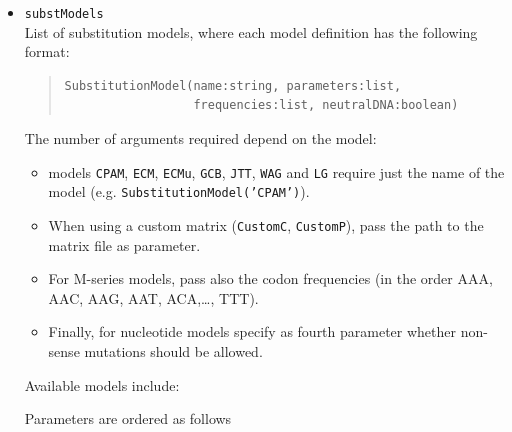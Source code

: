 \documentclass[11pt]{article}
\begin{document}
\begin{itemize}
\item{\texttt{substModels}} \hfill \\
List of substitution models, where each model definition has the following format:
\begin{quote}
\begin{verbatim}
SubstitutionModel(name:string, parameters:list, 
                  frequencies:list, neutralDNA:boolean)
\end{verbatim}
\end{quote}
The number of arguments required depend on the model:
\begin{itemize}
\item models \texttt{CPAM}, \texttt{ECM}, \texttt{ECMu}, \texttt{GCB}, \texttt{JTT}, \texttt{WAG} and \texttt{LG} require just the name of the model (e.g. \texttt{SubstitutionModel('CPAM')}).
\item When using a custom matrix (\texttt{CustomC}, \texttt{CustomP}), pass the path to the matrix file as parameter.
\item For M-series models, pass also the codon frequencies (in the order AAA, AAC, AAG, AAT, ACA,\ldots, TTT).
\item Finally, for nucleotide models specify as fourth parameter whether non-sense mutations should be allowed.
\end{itemize}
Available models include:
Parameters are ordered as follows
\end{itemize}
\end{document}
